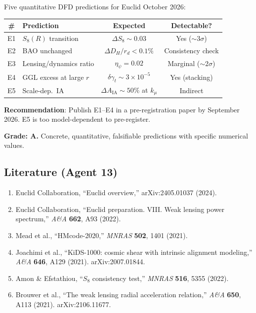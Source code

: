 \documentclass[11pt,a4paper]{article}
\begin{document}
\begin{tcolorbox}[colback=blue!5!white, colframe=blue!60!black, title={Agent 13: Euclid Pre-Registration Summary}]
Five quantitative DFD predictions for Euclid October 2026:
\begin{center}
\begin{tabular}{clcc}
\toprule
\textbf{\#} & \textbf{Prediction} & \textbf{Expected} & \textbf{Detectable?} \\
\midrule
E1 & $S_8(R)$ transition & $\Delta S_8 \sim 0.03$ & Yes ($\sim 3\sigma$) \\
E2 & BAO unchanged & $\Delta D_H/r_d < 0.1\%$ & Consistency check \\
E3 & Lensing/dynamics ratio & $\eta_\psi = 0.02$ & Marginal ($\sim 2\sigma$) \\
E4 & GGL excess at large $r$ & $\delta\gamma_t \sim 3 \times 10^{-5}$ & Yes (stacking) \\
E5 & Scale-dep.\ IA & $\Delta A_{\mathrm{IA}} \sim 50\%$ at $k_\mu$ & Indirect \\
\bottomrule
\end{tabular}
\end{center}

\textbf{Recommendation}: Publish E1--E4 in a pre-registration paper by September 2026. E5 is too model-dependent to pre-register.

\textbf{Grade: A.} Concrete, quantitative, falsifiable predictions with specific numerical values.
\end{tcolorbox}

\subsection{Literature (Agent 13)}

\begin{enumerate}
\item Euclid Collaboration, ``Euclid overview,'' arXiv:2405.01037 (2024).
\item Euclid Collaboration, ``Euclid preparation. VIII. Weak lensing power spectrum,'' \textit{A\&A} \textbf{662}, A93 (2022).
\item Mead et al., ``HMcode-2020,'' \textit{MNRAS} \textbf{502}, 1401 (2021).
\item Joachimi et al., ``KiDS-1000: cosmic shear with intrinsic alignment modeling,'' \textit{A\&A} \textbf{646}, A129 (2021). arXiv:2007.01844.
\item Amon \& Efstathiou, ``$S_8$ consistency test,'' \textit{MNRAS} \textbf{516}, 5355 (2022).
\item Brouwer et al., ``The weak lensing radial acceleration relation,'' \textit{A\&A} \textbf{650}, A113 (2021). arXiv:2106.11677.
\end{enumerate}
\end{document}
